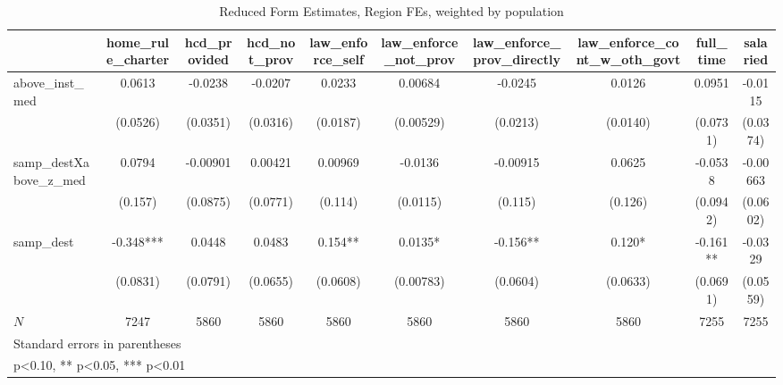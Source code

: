 \begin{table}[htbp]\centering
\def\sym#1{\ifmmode^{#1}\else\(^{#1}\)\fi}
\caption{Reduced Form Estimates, Region FEs, weighted by population}
\begin{tabular}{l*{9}{c}}
\toprule
            &\multicolumn{1}{c}{home\_rule\_charter}&\multicolumn{1}{c}{hcd\_provided}&\multicolumn{1}{c}{hcd\_not\_prov}&\multicolumn{1}{c}{law\_enforce\_self}&\multicolumn{1}{c}{law\_enforce\_not\_prov}&\multicolumn{1}{c}{law\_enforce\_prov\_directly}&\multicolumn{1}{c}{law\_enforce\_cont\_w\_oth\_govt}&\multicolumn{1}{c}{full\_time}&\multicolumn{1}{c}{salaried}\\
\midrule
above\_inst\_med&      0.0613   &     -0.0238   &     -0.0207   &      0.0233   &     0.00684   &     -0.0245   &      0.0126   &      0.0951   &     -0.0115   \\
            &    (0.0526)   &    (0.0351)   &    (0.0316)   &    (0.0187)   &   (0.00529)   &    (0.0213)   &    (0.0140)   &    (0.0731)   &    (0.0374)   \\
\addlinespace
samp\_destXabove\_z\_med&      0.0794   &    -0.00901   &     0.00421   &     0.00969   &     -0.0136   &    -0.00915   &      0.0625   &     -0.0538   &    -0.00663   \\
            &     (0.157)   &    (0.0875)   &    (0.0771)   &     (0.114)   &    (0.0115)   &     (0.115)   &     (0.126)   &    (0.0942)   &    (0.0602)   \\
\addlinespace
samp\_dest   &      -0.348***&      0.0448   &      0.0483   &       0.154** &      0.0135*  &      -0.156** &       0.120*  &      -0.161** &     -0.0329   \\
            &    (0.0831)   &    (0.0791)   &    (0.0655)   &    (0.0608)   &   (0.00783)   &    (0.0604)   &    (0.0633)   &    (0.0691)   &    (0.0559)   \\
\midrule
\(N\)       &        7247   &        5860   &        5860   &        5860   &        5860   &        5860   &        5860   &        7255   &        7255   \\
\bottomrule
\multicolumn{10}{l}{\footnotesize Standard errors in parentheses}\\
\multicolumn{10}{l}{\footnotesize * p<0.10, ** p<0.05, *** p<0.01}\\
\end{tabular}
\end{table}
